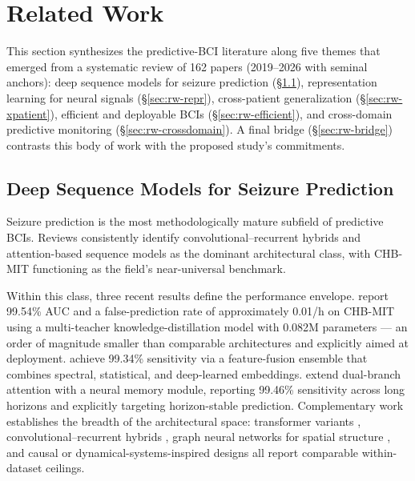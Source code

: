 
\section{Related Work}
\label{sec:relatedwork}

This section synthesizes the predictive-BCI literature along five themes that emerged from a systematic review of 162 papers (2019--2026 with seminal anchors): deep sequence models for seizure prediction (\S\ref{sec:rw-sequence}), representation learning for neural signals (\S\ref{sec:rw-repr}), cross-patient generalization (\S\ref{sec:rw-xpatient}), efficient and deployable BCIs (\S\ref{sec:rw-efficient}), and cross-domain predictive monitoring (\S\ref{sec:rw-crossdomain}). A final bridge (\S\ref{sec:rw-bridge}) contrasts this body of work with the proposed study's commitments.

\subsection{Deep Sequence Models for Seizure Prediction}
\label{sec:rw-sequence}

Seizure prediction is the most methodologically mature subfield of predictive BCIs. Reviews \cite{WuEtAl2025,TanEtAl2025,RenEtAl2022,YimanWenqi2025,WongEtAl2023} consistently identify convolutional--recurrent hybrids and attention-based sequence models as the dominant architectural class, with CHB-MIT functioning as the field's near-universal benchmark.

Within this class, three recent results define the performance envelope. \citet{CaoEtAl2026} report 99.54\% AUC and a false-prediction rate of approximately 0.01/h on CHB-MIT using a multi-teacher knowledge-distillation model with 0.082M parameters --- an order of magnitude smaller than comparable architectures and explicitly aimed at deployment. \citet{AlkhrijahEtAl2025} achieve 99.34\% sensitivity via a feature-fusion ensemble that combines spectral, statistical, and deep-learned embeddings. \citet{PhamTran2026} extend dual-branch attention with a neural memory module, reporting 99.46\% sensitivity across long horizons and explicitly targeting horizon-stable prediction. Complementary work establishes the breadth of the architectural space: transformer variants \cite{MahdiBaghdadi2026,GodoyEtAl2022,ZhengEtAl2025,ShiLiu2023,WangEtAl2026a}, convolutional--recurrent hybrids \cite{DaoudBayoumi2019,ChoiEtAl2022,AbdelhameedBayoumi2021,HusseinEtAl2022,Chen2023,AnsariEtAl2020}, graph neural networks for spatial structure \cite{ZhouEtAl2026a,AmiriEtAl2026,AbbasiEtAl2025,LiaoEtAl2025a}, and causal or dynamical-systems-inspired designs \cite{QuEtAl2026,WangEtAl2025c,WangEtAl2025b,WangEtAl2026b} all report comparable within-dataset ceilings.

